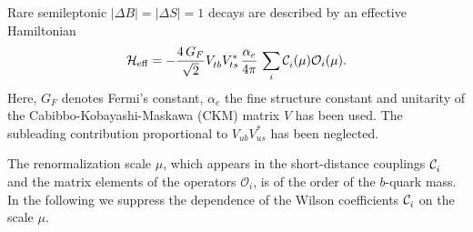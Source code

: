 Rare semileptonic $|\Delta B| = |\Delta S| = 1$ decays
are described by an effective Hamiltonian
\begin{align}
  \label{eq:Heff}
  {\cal{H}}_{\rm eff}= 
   - \frac{4\, G_F}{\sqrt{2}}  V_{tb}^{} V_{ts}^\ast \,\frac{\alpha_e}{4 \pi}\,
     \sum_i \wilson[]{i}(\mu)  \mathcal{O}_i(\mu).
\end{align}
Here, $G_F$ denotes Fermi's constant, $\alpha_e$ the fine structure constant and
unitarity of the Cabibbo-Kobayashi-Maskawa (CKM) matrix $V$ has been used. The
subleading contribution proportional to $V_{ub}^{} V_{us}^\ast$ has been
neglected. 

The renormalization scale $\mu$, which appears in the short-distance couplings
$\wilson[]{i}$ and the matrix elements of the operators $\mathcal{O}_i$, is of the order
of the $b$-quark mass. In the following we suppress the dependence of the Wilson
coefficients $\wilson{i}$ on the scale $\mu$.

